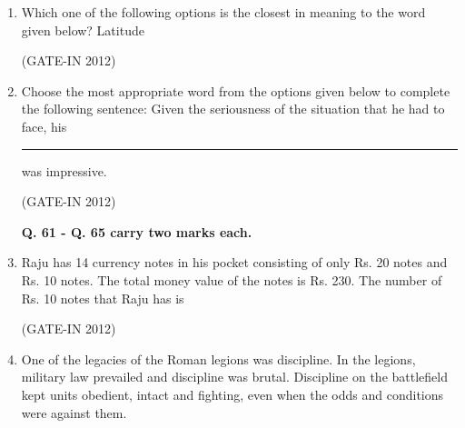 \documentclass[journal,12pt,onecolumn]{IEEEtran}
\theoremstyle{remark}
\begin{document}
\begin{enumerate}
\item Which one of the following options is the closest in meaning to the word given below?
Latitude

\hfill{(GATE-IN 2012)}
\begin{enumerate}
\end{enumerate}

\item Choose the most appropriate word from the options given below to complete the following sentence:
Given the seriousness of the situation that he had to face, his \rule{2cm}{0.4pt} was impressive.

\hfill{(GATE-IN 2012)}
\begin{enumerate}
\end{enumerate}

\textbf{Q. 61 - Q. 65 carry two marks each. }


\item Raju has 14 currency notes in his pocket consisting of only Rs. 20 notes and Rs. 10 notes. The total money value of the notes is Rs. 230. The number of Rs. 10 notes that Raju has is

\hfill{(GATE-IN 2012)}
\begin{enumerate}
\end{enumerate}

\item One of the legacies of the Roman legions was discipline. In the legions, military law prevailed and discipline was brutal. Discipline on the battlefield kept units obedient, intact and fighting, even when the odds and conditions were against them.


\end{enumerate}
\end{document}
